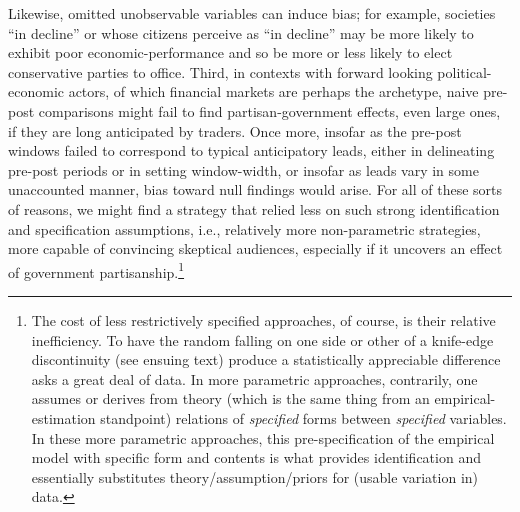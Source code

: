 \documentclass[12pt]{article}
\begin{document}
Likewise, omitted unobservable variables can induce bias; for example, societies ``in decline'' or whose citizens perceive as ``in decline'' may be more likely to exhibit poor economic-performance and so be more or less likely to elect conservative parties to office. Third, in contexts with forward looking political-economic actors, of which financial markets are perhaps the archetype, naive pre-post comparisons might fail to find partisan-government effects, even large ones, if they are long anticipated by traders. Once more, insofar as the pre-post windows failed to correspond to typical anticipatory leads, either in delineating pre-post periods or in setting window-width, or insofar as leads vary in some unaccounted manner, bias toward null findings would arise. For all of these sorts of reasons, we might find a strategy that relied less on such strong identification and specification assumptions, i.e., relatively more non-parametric strategies, more capable of convincing skeptical audiences, especially if it uncovers an effect of government partisanship.\footnote{The cost of less restrictively specified approaches, of course, is their relative inefficiency. To have the random falling on one side or other of a knife-edge discontinuity (see ensuing text) produce a statistically appreciable difference asks a great deal of data. In more parametric approaches, contrarily, one assumes or derives from theory (which is the same thing from an empirical-estimation standpoint) relations of \textit{specified} forms between \textit{specified} variables. In these more parametric approaches, this pre-specification of the empirical model with specific form and contents is what provides identification and essentially substitutes theory/assumption/priors for (usable variation in) data.}
\end{document}
